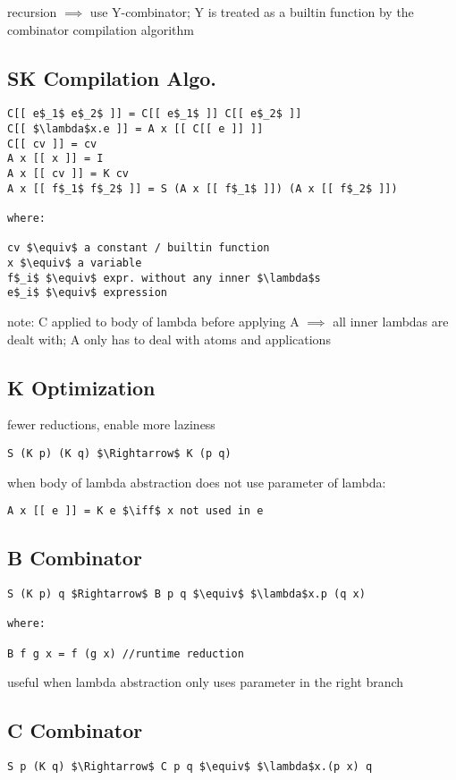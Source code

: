 \documentclass[8pt]{extarticle}
\begin{document}
\begin{multicols*}{2}
recursion $\implies$ use Y-combinator; Y is treated as a builtin function by the combinator compilation algorithm

\subsection{SK Compilation Algo.}
\begin{lstlisting}
C[[ e$_1$ e$_2$ ]] = C[[ e$_1$ ]] C[[ e$_2$ ]]
C[[ $\lambda$x.e ]] = A x [[ C[[ e ]] ]]
C[[ cv ]] = cv
A x [[ x ]] = I
A x [[ cv ]] = K cv
A x [[ f$_1$ f$_2$ ]] = S (A x [[ f$_1$ ]]) (A x [[ f$_2$ ]])

where:

cv $\equiv$ a constant / builtin function
x $\equiv$ a variable
f$_i$ $\equiv$ expr. without any inner $\lambda$s
e$_i$ $\equiv$ expression
\end{lstlisting}

note: C applied to body of lambda before applying A $\implies$ all inner lambdas are dealt with; A only has to deal with atoms and applications

\subsection{K Optimization}

fewer reductions, enable more laziness

\begin{lstlisting}
S (K p) (K q) $\Rightarrow$ K (p q)
\end{lstlisting}

when body of lambda abstraction does not use parameter of lambda:
\begin{lstlisting}
A x [[ e ]] = K e $\iff$ x not used in e
\end{lstlisting}

\subsection{B Combinator}

\begin{lstlisting}
S (K p) q $Rightarrow$ B p q $\equiv$ $\lambda$x.p (q x)

where:

B f g x = f (g x) //runtime reduction
\end{lstlisting}

useful when lambda abstraction only uses parameter in the right branch

\subsection{C Combinator}
\begin{lstlisting}
S p (K q) $\Rightarrow$ C p q $\equiv$ $\lambda$x.(p x) q


\end{lstlisting}
\end{multicols*}
\end{document}

